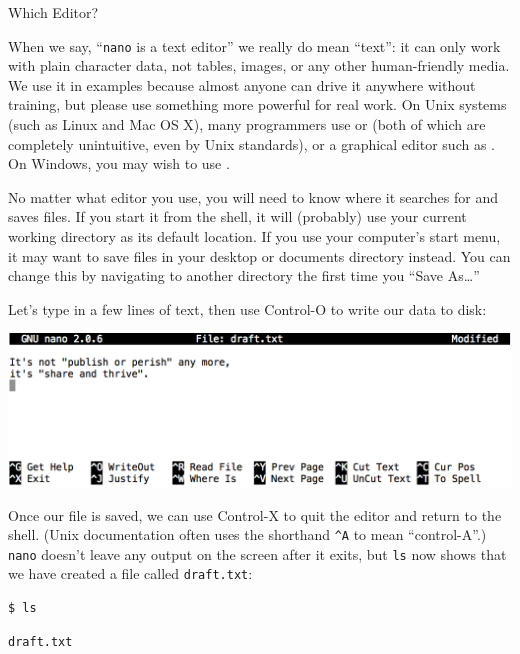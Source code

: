 \documentclass{book}
\begin{document}
\begin{swcbox}{Which Editor?}

When we say, ``\texttt{nano} is a text editor'' we really do mean
``text'': it can only work with plain character data, not tables,
images, or any other human-friendly media. We use it in examples because
almost anyone can drive it anywhere without training, but please use
something more powerful for real work. On Unix systems (such as Linux
and Mac OS X), many programmers use
 or
 (both of which are completely
unintuitive, even by Unix standards), or a graphical editor such as
. On Windows, you may wish
to use .

No matter what editor you use, you will need to know where it searches
for and saves files. If you start it from the shell, it will (probably)
use your current working directory as its default location. If you use
your computer's start menu, it may want to save files in your desktop or
documents directory instead. You can change this by navigating to
another directory the first time you ``Save As\ldots{}''

\end{swcbox}

Let's type in a few lines of text, then use Control-O to write our data
to disk:

\includegraphics{novice/shell/img/nano-screenshot.png}

Once our file is saved, we can use Control-X to quit the editor and
return to the shell. (Unix documentation often uses the shorthand
\texttt{\^{}A} to mean ``control-A''.) \texttt{nano} doesn't leave any
output on the screen after it exits, but \texttt{ls} now shows that we
have created a file called \texttt{draft.txt}:

\begin{verbatim}
$ ls
\end{verbatim}

\begin{verbatim}
draft.txt
\end{verbatim}
\end{document}

